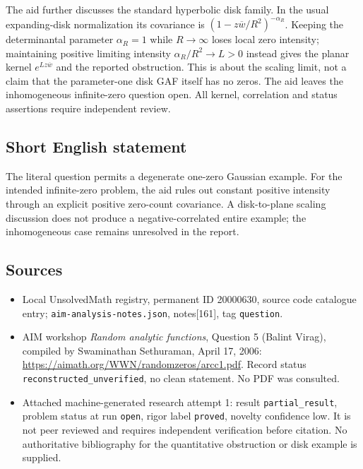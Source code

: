 \documentclass[11pt]{article}
\begin{document}
The aid further discusses the standard hyperbolic disk family. In the usual expanding-disk normalization its covariance is $(1-z\overline w/R^2)^{-\alpha_R}$. Keeping the determinantal parameter $\alpha_R=1$ while $R\to\infty$ loses local zero intensity; maintaining positive limiting intensity $\alpha_R/R^2\to L>0$ instead gives the planar kernel $e^{Lz\overline w}$ and the reported obstruction. This is about the scaling limit, not a claim that the parameter-one disk GAF itself has no zeros. The aid leaves the inhomogeneous infinite-zero question open. All kernel, correlation and status assertions require independent review.
\subsection{Short English statement}
The literal question permits a degenerate one-zero Gaussian example. For the intended infinite-zero problem, the aid rules out constant positive intensity through an explicit positive zero-count covariance. A disk-to-plane scaling discussion does not produce a negative-correlated entire example; the inhomogeneous case remains unresolved in the report.
\subsection{Sources}
\begin{itemize}
\item Local UnsolvedMath registry, permanent ID 20000630, source code catalogue entry; \texttt{aim-analysis-notes.json}, notes[161], tag \texttt{question}.
\item AIM workshop \emph{Random analytic functions}, Question 5 (Balint Virag), compiled by Swaminathan Sethuraman, April 17, 2006: \url{https://aimath.org/WWN/randomzeros/arcc1.pdf}. Record status \texttt{reconstructed\_unverified}, no clean statement. No PDF was consulted.
\item Attached machine-generated research attempt 1: result \texttt{partial\_result}, problem status at run \texttt{open}, rigor label \texttt{proved}, novelty confidence low. It is not peer reviewed and requires independent verification before citation. No authoritative bibliography for the quantitative obstruction or disk example is supplied.
\end{itemize}
\end{document}
